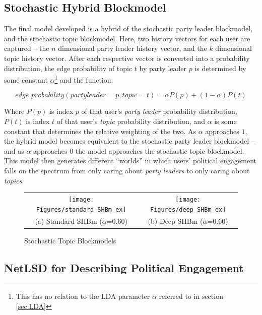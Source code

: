 \subsection{Stochastic Hybrid Blockmodel}\label{sec:SHBM}

The final model developed is a hybrid of the stochastic party leader blockmodel,
and the stochastic topic blockmodel. Here, two history vectors for each user are
captured -- the $n$ dimensional party leader history vector, and the $k$
dimensional topic history vector. After each respective vector is converted into
a probability distribution, the edge probability of topic $t$ by party leader
$p$ is determined by some constant $\alpha$\footnote{This has no relation to the
LDA parameter $\alpha$ referred to in section \ref{sec:LDA}} and the function:

\begin{equation}
    edge\_probability(party leader=p, topic=t)=\alpha P(p)+(1-\alpha)P(t)
\end{equation}

Where $P(p)$ is index $p$ of that user's \emph{party leader} probability
distribution, $P(t)$ is index $t$ of that user's \emph{topic} probability
distribution, and $\alpha$ is some constant that determines the relative
weighting of the two. As $\alpha$ approaches $1$, the hybrid model becomes
equivalent to the stochastic party leader blockmodel -- and as $\alpha$
approaches $0$ the model approaches the stochastic topic blockmodel. This model
then generates different ``worlds'' in which users' political engagement falls
on the spectrum from only caring about \emph{party leaders} to only caring about
\emph{topics}.

\begin{singlespacing}
    \begin{figure}
        \centering
        \begin{tabular}{cc}
          \texttt{[image: Figures/standard\_SHBm\_ex]} &
          \texttt{[image: Figures/deep\_SHBm\_ex]} \\
        (a) Standard SHBm ($\alpha$=0.60) & (b) Deep SHBm ($\alpha$=0.60)\\[6pt]
        \end{tabular}
        \caption[Stochastic Topic Blockmodels]{Stochastic Topic Blockmodels}
        \label{fig:SHBm_examples}
    \end{figure}
\end{singlespacing}

\subsection{NetLSD for Describing Political Engagement}\label{sec:NetLSDForSBM}

